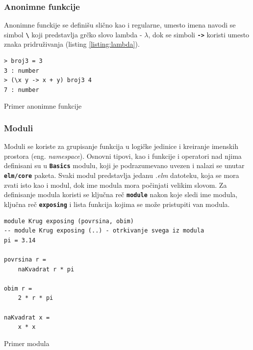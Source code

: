 \documentclass[12pt,oneside]{memoir}
\begin{document}
\subsubsection{Anonimne funkcije}
Anonimne funckije se definišu slično kao i regularne, umesto imena navodi se simbol 
\texttt{\textbf{\textbackslash}} koji predstavlja grčko slovo lambda - \(\lambda\),
dok se simboli \texttt{\textbf{->}} koristi umesto znaka pridruživanja (listing \ref{listing:lambda}).
\begin{listing}[h]
\begin{verbatim}
> broj3 = 3
3 : number
> (\x y -> x + y) broj3 4
7 : number
\end{verbatim}
\caption{Primer anonimne funkcije}
\label{listing:lambda}
\end{listing}

\subsubsection{Moduli}
Moduli se koriste za grupisanje funkcija u logičke jedinice i kreiranje imenskih 
prostora (eng. \emph{namespace}). Osnovni tipovi, kao i funkcije i operatori nad njima 
definisani su u \texttt{\textbf{Basics}} modulu, koji je podrazumevano uvezen i nalazi se 
unutar \texttt{\textbf{elm/core}} paketa. Svaki modul predstavlja jedanu \emph{.elm} datoteku,
koja se mora zvati isto kao i modul, dok ime modula mora počinjati velikim slovom.
Za definisanje modula koristi se ključna reč \texttt{\textbf{module}} nakon koje sledi
ime modula, ključna reč \texttt{\textbf{exposing}} i lista funkcija kojima se može 
pristupiti van modula.
\begin{listing}[h]
\begin{verbatim}
module Krug exposing (povrsina, obim) 
-- module Krug exposing (..) - otrkivanje svega iz modula 
pi = 3.14

povrsina r =
    naKvadrat r * pi

obim r =
    2 * r * pi

naKvadrat x =
    x * x
\end{verbatim}
\caption{Primer modula}
\label{listing:modul}
\end{listing}
\end{document}
